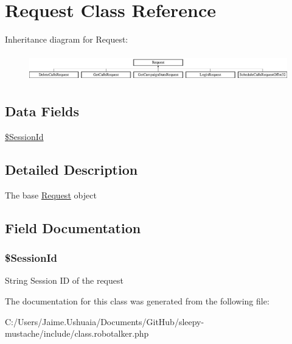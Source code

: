 \hypertarget{class_request}{\section{Request Class Reference}
\label{class_request}
}
Inheritance diagram for Request\-:\begin{figure}[H]
\begin{center}
\leavevmode
\includegraphics[height=1.204301cm]{class_request}
\end{center}
\end{figure}
\subsection*{Data Fields}
\begin{DoxyCompactItemize}
\item 
\hyperlink{class_request_af36f2c89cc01324e295786be80a30f3a}{\$\-Session\-Id}
\end{DoxyCompactItemize}


\subsection{Detailed Description}
The base \hyperlink{class_request}{Request} object 

\subsection{Field Documentation}
\hypertarget{class_request_af36f2c89cc01324e295786be80a30f3a}{
\subsubsection[{\$\-Session\-Id}]{\setlength{\rightskip}{0pt plus 5cm}\$Session\-Id}}\label{class_request_af36f2c89cc01324e295786be80a30f3a}
String Session I\-D of the request 

The documentation for this class was generated from the following file\-:\begin{DoxyCompactItemize}
\item 
C\-:/\-Users/\-Jaime.\-Ushuaia/\-Documents/\-Git\-Hub/sleepy-\/mustache/include/class.\-robotalker.\-php\end{DoxyCompactItemize}
